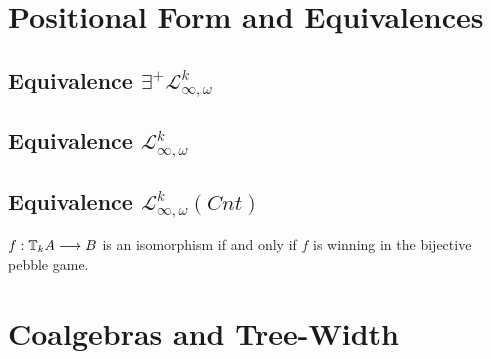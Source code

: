 \section{Positional Form and Equivalences}
\subsection{Equivalence $\exists^{+}\mathcal{L}^{k}_{\infty,\omega}$}
\begin{thm}[{}]
\end{thm}
\subsection{Equivalence $\mathcal{L}^{k}_{\infty,\omega}$}
\subsection{Equivalence $\mathcal{L}^{k}_{\infty,\omega}(Cnt)$}
\begin{prop}
$f:{\mathbb{T}_{k}A} \longrightarrow B$ is an isomorphism if and only if $f$ is winning in the bijective pebble game.
\end{prop}
\section{Coalgebras and Tree-Width}
